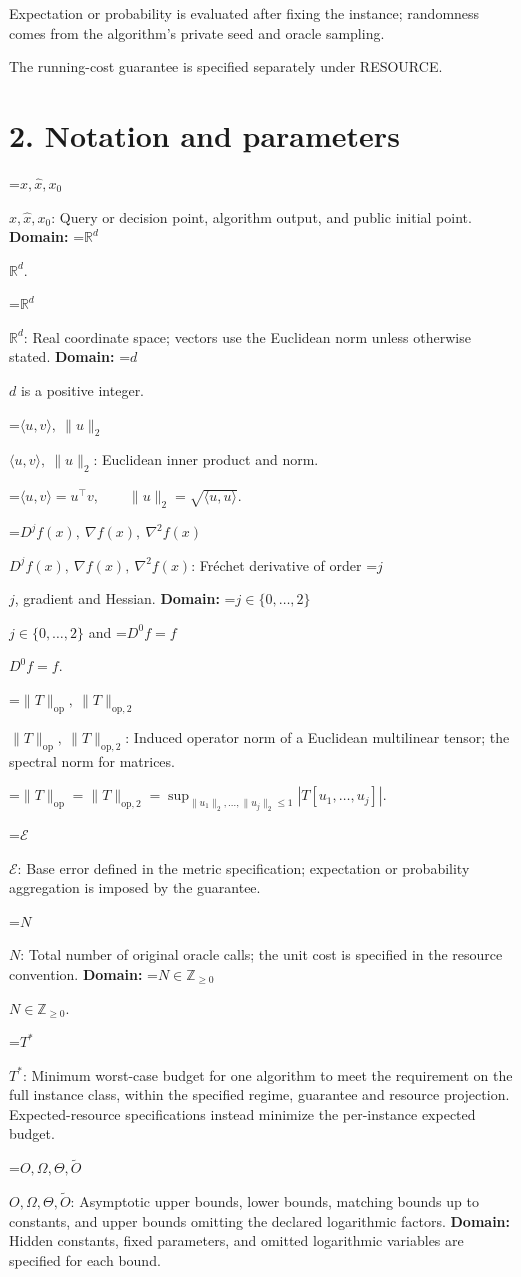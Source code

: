 \documentclass[10pt,a4paper]{article}
\newcommand{\AtlasMath}[1]{\par\begingroup\centering\setbox0=\hbox{$\displaystyle #1$}\ifdim\wd0>1.4\linewidth\typeout{ATLAS WIDE FORMULA: \the\wd0}\fi\ifdim\wd0>\linewidth\resizebox{\linewidth}{!}{\box0}\else\box0\fi\par\endgroup}
\newcommand{\AtlasInlineMath}[1]{\begingroup\setbox0=\hbox{$#1$}\ifdim\wd0>.4\linewidth\endgroup\AtlasMath{#1}\else\endgroup$#1$\fi}
\begin{document}
Expectation or probability is evaluated after fixing the instance; randomness comes from the algorithm's private seed and oracle sampling.

The running-cost guarantee is specified separately under RESOURCE.

\section{2. Notation and parameters}
\AtlasInlineMath{x,\widehat{x},x_0}: Query or decision point, algorithm output, and public initial point. \textbf{Domain:} \AtlasInlineMath{\mathbb{R}^d}.

\AtlasInlineMath{\mathbb{R}^d}: Real coordinate space; vectors use the Euclidean norm unless otherwise stated. \textbf{Domain:} \AtlasInlineMath{d} is a positive integer.

\AtlasInlineMath{\langle u,v\rangle,\ \|u\|_2}: Euclidean inner product and norm.


\AtlasMath{\langle u,v\rangle=u^\top v,\qquad\|u\|_2=\sqrt{\langle u,u\rangle}.}


\AtlasInlineMath{D^jf(x),\ \nabla f(x),\ \nabla^2f(x)}: Fréchet derivative of order \AtlasInlineMath{j}, gradient and Hessian. \textbf{Domain:} \AtlasInlineMath{j\in\{0,\ldots,2\}} and \AtlasInlineMath{D^0f=f}.

\AtlasInlineMath{\|T\|_{\mathrm{op}},\ \|T\|_{\mathrm{op},2}}: Induced operator norm of a Euclidean multilinear tensor; the spectral norm for matrices.


\AtlasMath{\|T\|_{\mathrm{op}}=\|T\|_{\mathrm{op},2}=\sup_{\|u_1\|_2,\ldots,\|u_j\|_2\le1}|T[u_1,\ldots,u_j]|.}


\AtlasInlineMath{\mathcal{E}}: Base error defined in the metric specification; expectation or probability aggregation is imposed by the guarantee.

\AtlasInlineMath{N}: Total number of original oracle calls; the unit cost is specified in the resource convention. \textbf{Domain:} \AtlasInlineMath{N\in\mathbb{Z}_{\ge0}}.

\AtlasInlineMath{T^*}: Minimum worst-case budget for one algorithm to meet the requirement on the full instance class, within the specified regime, guarantee and resource projection. Expected-resource specifications instead minimize the per-instance expected budget.

\AtlasInlineMath{O,\Omega,\Theta,\widetilde{O}}: Asymptotic upper bounds, lower bounds, matching bounds up to constants, and upper bounds omitting the declared logarithmic factors. \textbf{Domain:} Hidden constants, fixed parameters, and omitted logarithmic variables are specified for each bound.
\end{document}
